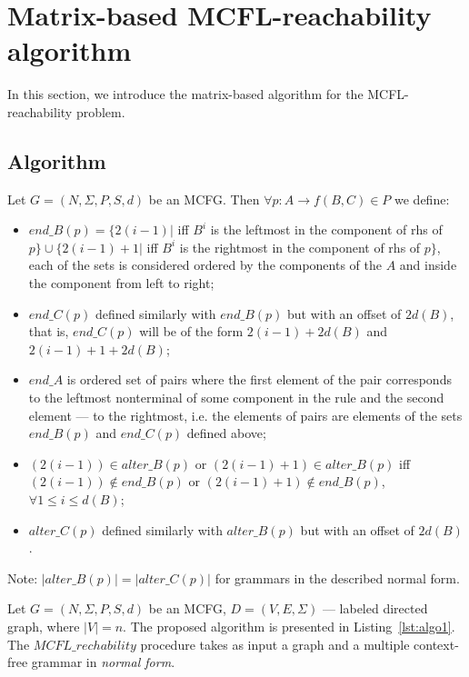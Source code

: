 \section{Matrix-based MCFL-reachability algorithm}
\label{sec:all-path-algo}
In this section, we introduce the matrix-based algorithm for the MCFL-reachability problem.

\subsection{Algorithm}
\begin{definition}
\label{def:sets-end-alter}
Let $G = (N, \Sigma, P, S, d)$ be an MCFG. Then $\forall p: A \rightarrow f(B,C) \in P$ we define:
\begin{itemize}
    \item $end\_B(p) = \{2(i - 1)|$ iff $B^i$ is the leftmost in the component of rhs of $p\} \cup \{2(i - 1) + 1 |$ iff $B^i$ is the rightmost in the component of rhs of $p\}$, each of the sets is considered ordered by the components of the $A$ and inside the component from left to right;
    \item $end\_C(p)$ defined similarly with $end\_B(p)$ but with an offset of $2d(B)$, that is, $end\_C(p)$ will be of the form $2(i - 1) + 2d(B)$ and $2(i - 1) + 1 + 2d(B)$;
    \item $end\_A$ is ordered set of pairs where the first element of the pair corresponds to the leftmost nonterminal of some component in the rule and the second element --- to the rightmost, i.e. the elements of pairs are elements of the sets $end\_B(p)$ and $end\_C(p)$ defined above;
    \item $(2(i - 1)) \in alter\_B(p)$ or $(2(i - 1) + 1) \in alter\_B(p)$ iff $(2(i - 1)) \notin end\_B(p)$ or $(2(i - 1) + 1) \notin end\_B(p)$, $\forall 1 \leq i \leq d(B)$;
    \item $alter\_C(p)$ defined similarly with $alter\_B(p)$ but with an offset of $2d(B)$.
\end{itemize}
\end{definition}

Note: $|alter\_B(p)| = |alter\_C(p)|$ for grammars in the described normal form.

Let $G = (N, \Sigma, P, S, d)$ be an MCFG, $D = (V,E, \Sigma)$ --- labeled directed graph, where $|V| = n$. The proposed algorithm is presented in Listing~\ref{lst:algo1}. The $MCFL\_rechability$ procedure takes as input a graph and a multiple context-free grammar in \emph{normal form}. 

